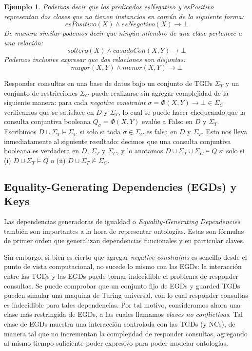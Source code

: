 \documentclass[11pt,a4paper,twoside]{tesis}
\newtheorem{exmp}{Ejemplo}
\begin{document}
\begin{exmp}
Podemos decir que los predicados esNegativo y esPositivo representan dos clases que no tienen instancias en común de la siguiente forma: $$esPositivo(X) \land esNegativo(X) \rightarrow \bot$$
De manera similar podemos decir que ningún miembro de una clase pertenece a una relación:$$soltero(X) \land casadoCon(X, Y) \rightarrow \bot $$ Podemos inclusive expresar que dos relaciones son disjuntas: $$mayor(X,Y) \land menor(X, Y) \rightarrow \bot$$
\end{exmp}

Responder consultas en una base de datos bajo un conjunto de TGDs $\Sigma_T$ y un conjunto de restricciones $\Sigma_C$ puede realizarse sin agregar complejidad de la siguiente manera: para cada \textit{negative constraint} $\sigma = \Phi(X,Y) \rightarrow \bot \in \Sigma_C$ verificamos que se satisface en $D$ y $\Sigma_T$, lo cual se puede hacer chequeando que la consulta conjuntiva booleana $Q_\sigma = \Phi(X, Y)$ evalúe a Falso en $D$ y $\Sigma_T$. Escribimos $D \cup \Sigma_T \models \Sigma_C$ si solo si toda $\sigma \in \Sigma_C$ es falsa en $D$ y $\Sigma_T$. Esto nos lleva inmediatamente al siguiente resultado: decimos que una consulta conjuntiva booleana es verdadera en $D$, $\Sigma_T$ y $\Sigma_C$, y lo anotamos $D \cup \Sigma_T \cup  \Sigma_C \models Q$ si solo si (i) $D \cup \Sigma_T \models Q$ o (ii) $D \cup \Sigma_T \not\models \Sigma_C$.

\subsection{Equality-Generating Dependencies (EGDs) y Keys}
Las dependencias generadoras de igualdad o \textit{Equality-Generating Dependencies} también son importantes a la hora de representar ontologías. Estas son fórmulas de primer orden que generalizan dependencias funcionales y en particular claves.

Sin embargo, si bien es cierto que agregar \textit{negative constraints} es sencillo desde el punto de vista computacional, no sucede lo mismo con las EGDs: la interacción entre las TGDs y las EGDs puede tornar indecidible el problema de responder consultas\cite{Johnson}. Se puede comprobar que un conjunto fijo de EGDs y guarded TGDs pueden simular una maquina de Turing universal, con lo cual responder consultas es indecidible para tales dependencias. Por tal motivo, consideramos ahora una clase más restringida de EGDs, a las cuales llamamos \textit{claves no conflictivas}. Tal clase de EGDs muestra una interacción controlada con las TGDs (y NCs), de manera tal que no incrementan la complejidad de responder consultas, agregando al mismo tiempo suficiente poder expresivo para poder modelar ontologías.
\end{document}
